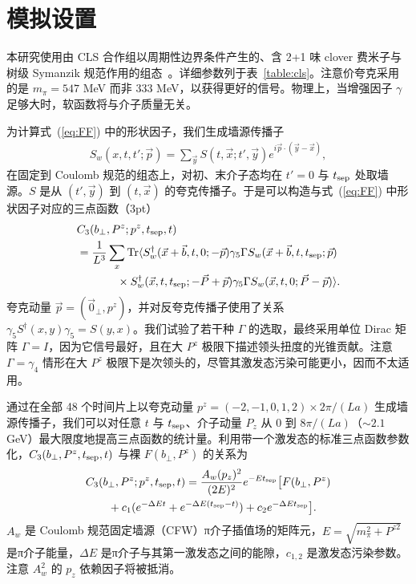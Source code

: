 \section{模拟设置}

本研究使用由 CLS 合作组以周期性边界条件产生的、含 2+1 味 clover 费米子与树级 Symanzik 规范作用的组态~\cite{Bruno:2014jqa}。详细参数列于表~\ref{table:cls}。注意价夸克采用的是 $m_\pi=547$ MeV 而非 333 MeV，以获得更好的信号。物理上，当增强因子 $\gamma$ 足够大时，软函数将与介子质量无关。

为计算式~(\ref{eq:FF}) 中的形状因子，我们生成墙源传播子
\begin{align}
 S_w(x,t,t';\vec{p})=\sum_{\vec{y}} S(t,\vec{x};t',\vec{y})e^{i\vec{p}\cdot(\vec{y}-\vec{x})},
\end{align}
在固定到 Coulomb 规范的组态上，对初、末介子态均在 $t'=0$ 与 $t_{\rm sep}$ 处取墙源。$S$ 是从 $(t',\vec{y})$ 到 $(t,\vec{x})$ 的夸克传播子。于是可以构造与式~(\ref{eq:FF}) 中形状因子对应的三点函数（3pt）
\begin{align}
&C_3(b_\perp,P^z;p^z,t_{\rm sep},t)\\
&=\frac{1}{L^3} \sum_x\textrm{Tr} \langle  S_{w}^\dagger(\vec{x}+\vec{b},t,0;-\vec{p})\gamma_5\Gamma S_{w}(\vec{x}+\vec{b},t,t_{\rm sep};\vec{p}) \nonumber\\
&\;\;\quad\quad \quad \times S_{w}^\dagger(\vec{x},t,t_{\rm sep};-\vec{P}+\vec{p}) \gamma_{5}\Gamma
 S_{w}(\vec{x},t,0;\vec{P}-\vec{p})\rangle\nonumber.
\end{align}
夸克动量 $\vec{p}=(\vec 0_{\perp},p^z)$，并对反夸克传播子使用了关系 $\gamma_5 S^{\dagger}(x,y)\gamma_5=S(y,x)$。我们试验了若干种 $\Gamma$ 的选取，最终采用单位 Dirac 矩阵 $\Gamma=I$，因为它信号最好，且在大 $P^z$ 极限下描述领头扭度的光锥贡献。注意 $\Gamma=\gamma_4$ 情形在大 $P^z$ 极限下是次领头的，尽管其激发态污染可能更小，因而不太适用。

通过在全部 48 个时间片上以夸克动量 ${p}^z=(-2,-1,0,1,2) \times 2\pi/(La)$ 生成墙源传播子，我们可以对任意 $t$ 与 $t_{\rm sep}$、介子动量 $P_z$ 从 0 到 $8\pi/(La)$（$\sim 2.1$ GeV）最大限度地提高三点函数的统计量。利用带一个激发态的标准三点函数参数化，$C_3(b_\perp,P^z,t_{\rm sep},t)$ 与裸 $F(b_\perp,P^z)$ 的关系为
\begin{align}
& C_3(b_\perp,P^z;p^z,t_{\rm sep},t)=\frac{A_w(p_z)^2}{(2E)^2}e^{-Et_{\rm sep}}\big[F(b_\perp,P^z)\nonumber\\
&\quad\quad+c_1(e^{-\Delta E t}+e^{-\Delta E (t_{\rm sep}-t)})+c_2e^{-\Delta E t_{\rm sep}}\big].
 \label{eq:3pt}
\end{align}
$A_w$ 是 Coulomb 规范固定墙源（CFW）π介子插值场的矩阵元，$E=\sqrt{m_{\pi}^2+{P}^{z2}}$ 是π介子能量，$\Delta E$ 是π介子与其第一激发态之间的能隙，$c_{1,2}$ 是激发态污染参数。注意 $A_w^2$ 的 $p_z$ 依赖因子将被抵消{。}

